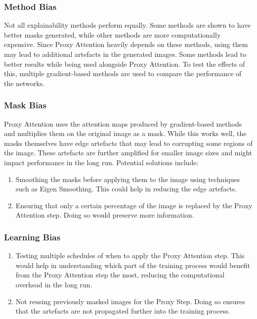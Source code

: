 \subsubsection{Method Bias}
Not all explainability methods perform equally. Some methods are shown to have better masks generated, while other methods are more computationally expensive. Since Proxy Attention heavily depends on these methods, using them may lead to additional artefacts in the generated images. Some methods lead to better results while being used alongside Proxy Attention. To test the effects of this, multiple gradient-based methods are used to compare the performance of the networks.

\subsubsection{Mask Bias}
Proxy Attention uses the attention maps produced by gradient-based methods and multiplies them on the original image as a mask. While this works well, the masks themselves have edge artefacts that may lead to corrupting some regions of the image. These artefacts are further amplified for smaller image sizes and might impact performance in the long run.
Potential solutions include:

\begin{enumerate}
    \item Smoothing the masks before applying them to the image using techniques such as Eigen Smoothing. This could help in reducing the edge artefacts.
    \item Ensuring that only a certain percentage of the image is replaced by the Proxy Attention step. Doing so would preserve more information.
\end{enumerate}

\subsubsection{Learning Bias}

\begin{enumerate}
    \item Testing multiple schedules of when to apply the Proxy Attention step. This would help in understanding which part of the training process would benefit from the Proxy Attention step the most, reducing the computational overhead in the long run.
    \item Not reusing previously masked images for the Proxy Step. Doing so ensures that the artefacts are not propagated further into the training process.
\end{enumerate}

